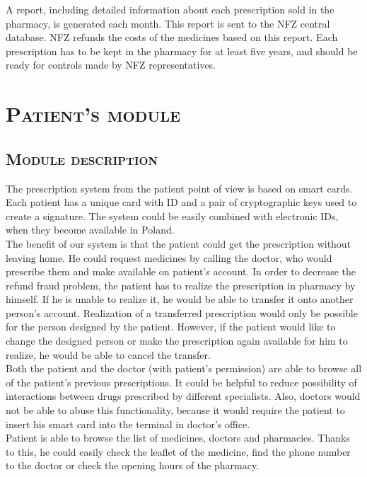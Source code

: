\documentclass[12pt,titlepage]{article}
\begin{document}
A report, including detailed information about each prescription sold in the pharmacy, is generated each month. 
This report is sent to the NFZ central database. 
NFZ refunds the costs of the medicines based on this report. 
Each prescription has to be kept in the pharmacy for at least five years, and should be ready for controls made by NFZ representatives.

\newpage

\section{\textsc{Patient's module}}
\subsection{\textsc{Module description}}
The prescription system from the patient point of view is based on smart cards. 
Each patient has a unique card with ID and a pair of cryptographic keys used to create a signature. 
The system could be easily combined with electronic IDs, when they become available in Poland.
\\

The benefit of our system is that the patient could get the prescription without leaving home. 
He could request medicines by calling the doctor, who would prescribe them and make available on patient's account. 
In order to decrease the refund fraud problem, the patient has to realize the prescription in pharmacy by himself. 
If he is unable to realize it, he would be able to transfer it onto another person's account. 
Realization of a transferred prescription would only be possible for the person designed by the patient. 
However, if the patient would like to change the designed person or make the prescription again available for him to realize, he would be able to cancel the transfer.
\\

Both the patient and the doctor (with patient's permission) are able to browse all of the patient's previous prescriptions. 
It could be helpful to reduce possibility of interactions between drugs prescribed by different specialists. 
Also, doctors would not be able to abuse this functionality, because it would require the patient to insert his smart card into the terminal in doctor's office.
\\

Patient is able to browse the list of medicines, doctors and pharmacies. 
Thanks to this, he could easily check the leaflet of the medicine, find the phone number to the doctor or check the opening hours of the pharmacy.
\end{document}
